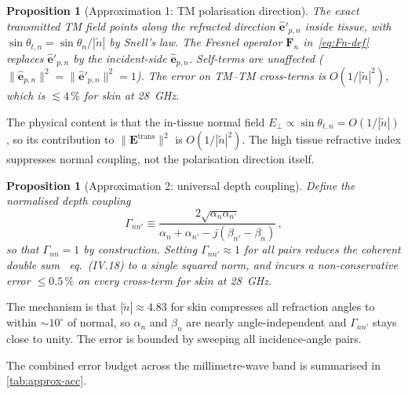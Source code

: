 \documentclass[journal,twocolumn,10pt]{IEEEtran}
\theoremstyle{plain}
\newtheorem{proposition}[theorem]{Proposition}
\theoremstyle{definition}
\theoremstyle{remark}
\newcommand{\EE}{\mathbf{E}}
\newcommand{\Fn}{\mathbf{F}_n}
\newcommand{\ntilde}{\tilde{n}}
\begin{document}
\begin{proposition}[Approximation 1: TM polarisation direction]
\label{prop:approx1-app}
The exact transmitted TM field points along the refracted direction
$\hat{\bm{e}}'_{p,n}$ inside tissue, with
$\sin\theta_{t,n} = \sin\theta_n / |\ntilde|$ by Snell's law. The
Fresnel operator $\Fn$ in~\eqref{eq:Fn-def} replaces
$\hat{\bm{e}}'_{p,n}$ by the incident-side $\hat{\bm{e}}_{p,n}$.
Self-terms are unaffected
($\|\hat{\bm{e}}_{p,n}\|^2 = \|\hat{\bm{e}}'_{p,n}\|^2 = 1$).
The error on TM--TM cross-terms is $O(1/|\ntilde|^2)$, which is
$\lesssim 4\,\%$ for skin at 28~GHz.
\end{proposition}

The physical content is that the in-tissue normal field
$E_\perp \propto \sin\theta_{t,n} = O(1/|\ntilde|)$, so its
contribution to $\|\EE^{\mathrm{trans}}\|^2$ is $O(1/|\ntilde|^2)$.
The high tissue refractive index suppresses normal coupling, not
the polarisation direction itself.

\begin{proposition}[Approximation 2: universal depth coupling]
\label{prop:approx2-app}
Define the normalised depth coupling
\begin{equation}\label{eq:Gamma-app}
  \Gamma_{nn'} \equiv
    \frac{2\sqrt{\alpha_n\alpha_{n'}}}
         {\alpha_n + \alpha_{n'} - j(\beta_{n'} - \beta_n)}\,,
\end{equation}
so that $\Gamma_{nn} = 1$ by construction. Setting
$\Gamma_{nn'} \approx 1$ for all pairs reduces the coherent double
sum~\cite{WydaegheMonograph} eq.~(IV.18) to a single squared norm,
and incurs a non-conservative error $\leq 0.5\,\%$ on every
cross-term for skin at 28~GHz.
\end{proposition}

The mechanism is that $|\ntilde| \approx 4.83$ for skin compresses
all refraction angles to within $\sim\!10^{\circ}$ of normal, so
$\alpha_n$ and $\beta_n$ are nearly angle-independent and
$\Gamma_{nn'}$ stays close to unity. The error is bounded by
sweeping all incidence-angle pairs.

The combined error budget across the millimetre-wave band is
summarised in \cref{tab:approx-acc}.
\end{document}
